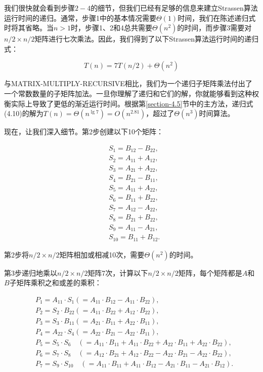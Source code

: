 \documentclass[lang=cn,newtx,10pt,scheme=chinese]{elegantbook}
\begin{document}
我们很快就会看到步骤$2-4$的细节，但我们已经有足够的信息来建立Strassen算法运行时间的递归。通常，步骤1中的基本情况需要$\Theta(1)$时间，我们在陈述递归式时将其省略。当$n>1$时，步骤1、2和4总共需要$\Theta(n^2)$的时间，而步骤3需要对$n/2\times n/2$矩阵进行七次乘法。因此，我们得到了以下Strassen算法运行时间的递归式：

\begin{equation}
T(n)=7 T(n / 2)+\Theta(n^2)
\end{equation}

与MATRIX-MULTIPLY-RECURSIVE相比，我们为一个递归子矩阵乘法付出了一个常数数量的子矩阵加法。一旦你理解了递归和它们的解，你就能够看到这种权衡实际上导致了更低的渐近运行时间。根据第\ref{section-4.5}节中的主方法，递归式(4.10)的解为$T(n)=\Theta(n^{\lg 7})=O(n^{2.81})$，超过了$\Theta(n^3)$时间算法。

现在，让我们深入细节。第2步创建以下10个矩阵：

$$
\begin{aligned}
& S_1=B_{12}-B_{22}, \\
& S_2=A_{11}+A_{12}, \\
& S_3=A_{21}+A_{22}, \\
& S_4=B_{21}-B_{11}, \\
& S_5=A_{11}+A_{22}, \\
& S_6=B_{11}+B_{22}, \\
& S_7=A_{12}-A_{22}, \\
& S_8=B_{21}+B_{22}, \\
& S_9=A_{11}-A_{21}, \\
& S_{10}=B_{11}+B_{12} .
\end{aligned}
$$

第2步将$n/2\times n/2$矩阵相加或相减10次，需要$\Theta(n^2)$的时间。

第3步递归地乘以$n/2\times n/2$矩阵7次，计算以下$n/2\times n/2$矩阵，每个矩阵都是$A$和$B$子矩阵乘积之和或差的乘积：

$$
\begin{aligned}
& P_1=A_{11} \cdot S_1(=A_{11} \cdot B_{12}-A_{11} \cdot B_{22}), \\
& P_2=S_2 \cdot B_{22}(=A_{11} \cdot B_{22}+A_{12} \cdot B_{22}), \\
& P_3=S_3 \cdot B_{11}(=A_{21} \cdot B_{11}+A_{22} \cdot B_{11}), \\
& P_4=A_{22} \cdot S_4(=A_{22} \cdot B_{21}-A_{22} \cdot B_{11}), \\
& P_5=S_5 \cdot S_6 \quad(=A_{11} \cdot B_{11}+A_{11} \cdot B_{22}+A_{22} \cdot B_{11}+A_{22} \cdot B_{22}), \\
& P_6=S_7 \cdot S_8 \quad(=A_{12} \cdot B_{21}+A_{12} \cdot B_{22}-A_{22} \cdot B_{21}-A_{22} \cdot B_{22}), \\
& P_7=S_9 \cdot S_{10} \quad(=A_{11} \cdot B_{11}+A_{11} \cdot B_{12}-A_{21} \cdot B_{11}-A_{21} \cdot B_{12}) .
\end{aligned}
$$
\end{document}
